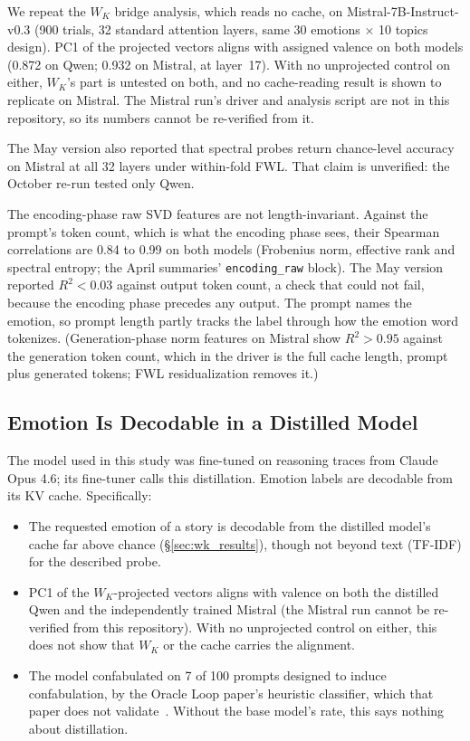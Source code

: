 \documentclass[11pt,a4paper]{article}
\begin{document}
We repeat the $W_K$ bridge analysis, which reads no cache, on Mistral-7B-Instruct-v0.3 (900 trials, 32 standard attention layers, same 30 emotions $\times$ 10 topics design). PC1 of the projected vectors aligns with assigned valence on both models (0.872 on Qwen; 0.932 on Mistral, at layer~17). With no unprojected control on either, $W_K$'s part is untested on both, and no cache-reading result is shown to replicate on Mistral. The Mistral run's driver and analysis script are not in this repository, so its numbers cannot be re-verified from it.

The May version also reported that spectral probes return chance-level accuracy on Mistral at all 32 layers under within-fold FWL. That claim is unverified: the October re-run tested only Qwen.

The encoding-phase raw SVD features are not length-invariant. Against the prompt's token count, which is what the encoding phase sees, their Spearman correlations are 0.84 to 0.99 on both models (Frobenius norm, effective rank and spectral entropy; the April summaries' \texttt{encoding\_raw} block). The May version reported $R^2 < 0.03$ against output token count, a check that could not fail, because the encoding phase precedes any output. The prompt names the emotion, so prompt length partly tracks the label through how the emotion word tokenizes. (Generation-phase norm features on Mistral show $R^2 > 0.95$ against the generation token count, which in the driver is the full cache length, prompt plus generated tokens; FWL residualization removes it.)

\subsection{Emotion Is Decodable in a Distilled Model}

The model used in this study was fine-tuned on reasoning traces from Claude Opus 4.6; its fine-tuner calls this distillation. Emotion labels are decodable from its KV cache. Specifically:

\begin{itemize}[nosep]
    \item The requested emotion of a story is decodable from the distilled model's cache far above chance (\S\ref{sec:wk_results}), though not beyond text (TF-IDF) for the described probe.
    \item PC1 of the $W_K$-projected vectors aligns with valence on both the distilled Qwen and the independently trained Mistral (the Mistral run cannot be re-verified from this repository). With no unprojected control on either, this does not show that $W_K$ or the cache carries the alignment.
    \item The model confabulated on 7 of 100 prompts designed to induce confabulation, by the Oracle Loop paper's heuristic classifier, which that paper does not validate~\citep{lyra2026oracle}. Without the base model's rate, this says nothing about distillation.
\end{itemize}
\end{document}
